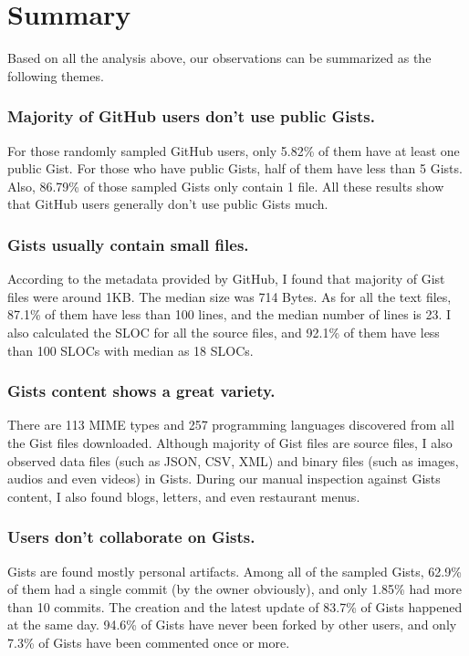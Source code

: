 \section{Summary}

Based on all the analysis above, our observations can be summarized as the following themes.

\subsubsection{Majority of GitHub users don't use public Gists.}

For those randomly sampled GitHub users, only 5.82\% of them have at least one public Gist. For those who have public Gists, half of them have less than 5 Gists. Also, 86.79\% of those sampled Gists only contain 1 file. All these results show that GitHub users generally don't use public Gists much. 

\subsubsection{Gists usually contain small files.}

According to the metadata provided by GitHub, I found that majority of Gist files were around 1KB. The median size was 714 Bytes. As for all the text files, 87.1\% of them have less than 100 lines, and the median number of lines is 23. I also calculated the SLOC for all the source files, and 92.1\% of them have less than 100 SLOCs with median as 18 SLOCs. 

\subsubsection{Gists content shows a great variety.}

There are 113 MIME types and 257 programming languages discovered from all the Gist files downloaded. Although majority of Gist files are source files, I also observed data files (such as JSON, CSV, XML) and binary files (such as images, audios and even videos) in Gists. During our manual inspection against Gists content, I also found blogs, letters, and even restaurant menus. 

\subsubsection{Users don't collaborate on Gists.}
Gists are found mostly personal artifacts. Among all of the sampled Gists, 62.9\% of them had a single commit (by the owner obviously), and only 1.85\% had more than 10 commits. The creation and the latest update of 83.7\% of Gists happened at the same day. 94.6\% of Gists have never been forked by other users, and only 7.3\% of Gists have been commented once or more. 

